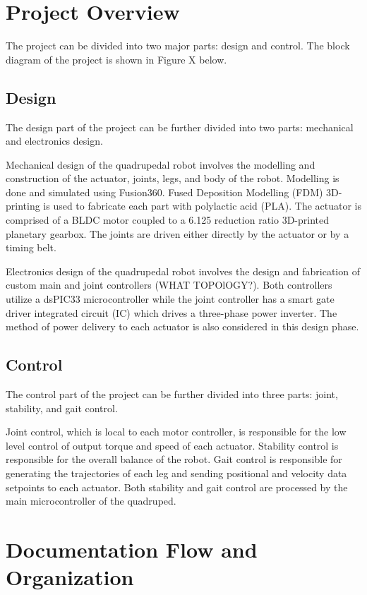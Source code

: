 \documentclass[english]{upeeei}
\begin{document}
\section{Project Overview}

The project can be divided into two major parts: design and control. The block diagram of the project is shown in Figure X below.

\subsection{Design}

The design part of the project can be further divided into two parts: mechanical and electronics design. 

Mechanical design of the quadrupedal robot involves the modelling and construction of the actuator, joints, legs, and body of the robot. Modelling is done and simulated using Fusion360. Fused Deposition Modelling (FDM) 3D-printing is used to fabricate each part with polylactic acid (PLA). The actuator is comprised of a BLDC motor coupled to a 6.125 reduction ratio 3D-printed planetary gearbox. The joints are driven either directly by the actuator or by a timing belt.

Electronics design of the quadrupedal robot involves the design and fabrication of custom main and joint controllers (WHAT TOPOlOGY?). Both controllers utilize a dsPIC33 microcontroller while the joint controller has a smart gate driver integrated circuit (IC) which drives a three-phase power inverter. The method of power delivery to each actuator is also considered in this design phase.

\subsection{Control}

The control part of the project can be further divided into three parts: joint, stability, and gait control.

Joint control, which is local to each motor controller, is responsible for the low level control of output torque and speed of each actuator. Stability control is responsible for the overall balance of the robot. Gait control is responsible for generating the trajectories of each leg and sending positional and velocity data setpoints to each actuator. Both stability and gait control are processed by the main microcontroller of the quadruped.

\section{Documentation Flow and Organization}
\end{document}
